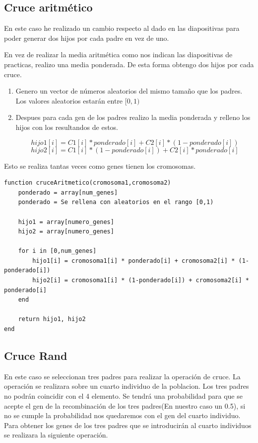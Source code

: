\documentclass[titlepage]{article}
\begin{document}
	\subsection{Cruce aritmético}
	
	En este caso he realizado un cambio respecto al dado en las diapositivas para poder generar dos hijos por cada padre en vez de uno.
	
	En vez de realizar la media aritmética como nos indican las diapositivas de practicas, realizo una media ponderada. De esta forma obtengo dos hijos por cada cruce.
	
	\begin{enumerate}
		\item Genero un vector de números aleatorios del mismo tamaño que los padres. Los valores aleatorios estarán entre $[0,1)$
		
		\item Despues para cada gen de los padres realizo la media ponderada y relleno los hijos con los resultandos de estos.
		
		$$
		hijo1[i] = C1[i] * ponderado[i] + C2[i] * (1-ponderado[i])
		$$
		$$
		hijo2[i] = C1[i] * (1-ponderado[i]) + C2[i] * ponderado[i]
		$$
		
		
	\end{enumerate} 
	Esto se realiza tantas veces como genes tienen los cromosomas.
	\newpage
	
	
	\begin{lstlisting}
function cruceAritmetico(cromosoma1,cromosoma2)
	ponderado = array[num_genes]
	ponderado = Se rellena con aleatorios en el rango [0,1)
	
	hijo1 = array[numero_genes]
	hijo2 = array[numero_genes]	
	
	for i in [0,num_genes]
		hijo1[i] = cromosoma1[i] * ponderado[i] + cromosoma2[i] * (1-ponderado[i])
		hijo2[i] = cromosoma1[i] * (1-ponderado[i]) + cromosoma2[i] * ponderado[i]
	end
	
	return hijo1, hijo2
end
	\end{lstlisting}
	
	\subsection{Cruce Rand}
	En este caso se seleccionan tres padres para realizar la operación de cruce. La operación se realizara sobre un cuarto individuo de la poblacion. Los tres padres no podrán coincidir con el 4 elemento. Se tendrá una probabilidad para que se acepte el gen de la recombinación de los tres padres(En nuestro caso un 0.5), si no se cumple la probabilidad nos quedaremos con el gen del cuarto individuo. Para obtener los genes de los tres padres que se introducirán al cuarto individuos se realizara la siguiente operación. 
	
\end{document}
